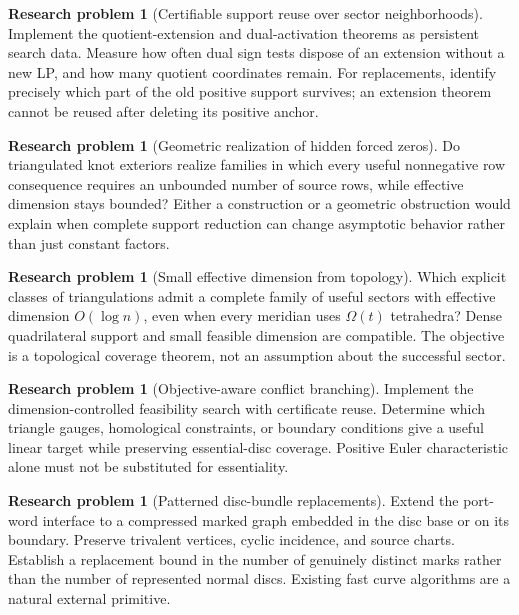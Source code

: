 \documentclass[11pt]{article}
\theoremstyle{definition}
\newtheorem{problem}[theorem]{Research problem}
\theoremstyle{remark}
\begin{document}
\begin{problem}[Certifiable support reuse over sector neighborhoods]
Implement the quotient-extension and dual-activation theorems as
persistent search data. Measure how often dual sign tests dispose of
an extension without a new LP, and how many quotient coordinates remain.
For replacements, identify precisely which part of the old positive
support survives; an extension theorem cannot be reused after deleting
its positive anchor.
\end{problem}

\begin{problem}[Geometric realization of hidden forced zeros]
Do triangulated knot exteriors realize families in which every useful
nonnegative row consequence requires an unbounded number of source
rows, while effective dimension stays bounded? Either a construction or
a geometric obstruction would explain when complete support reduction
can change asymptotic behavior rather than just constant factors.
\end{problem}

\begin{problem}[Small effective dimension from topology]
Which explicit classes of triangulations admit a complete family of
useful sectors with effective dimension \(O(\log n)\), even when every
meridian uses \(\Omega(t)\) tetrahedra? Dense quadrilateral support and
small feasible dimension are compatible. The objective is a topological
coverage theorem, not an assumption about the successful sector.
\end{problem}

\begin{problem}[Objective-aware conflict branching]
Implement the dimension-controlled feasibility search with certificate
reuse. Determine which triangle gauges, homological constraints, or
boundary conditions give a useful linear target while preserving
essential-disc coverage. Positive Euler characteristic alone must not
be substituted for essentiality.
\end{problem}

\begin{problem}[Patterned disc-bundle replacements]
Extend the port-word interface to a compressed marked graph embedded in
the disc base or on its boundary. Preserve trivalent vertices, cyclic
incidence, and source charts. Establish a replacement bound in the
number of genuinely distinct marks rather than the number of
represented normal discs. Existing fast curve algorithms
\cite{lackenby-curves} are a natural external primitive.
\end{problem}
\end{document}
